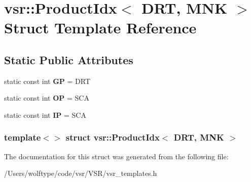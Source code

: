 \hypertarget{structvsr_1_1_product_idx_3_01_d_r_t_00_01_m_n_k_01_4}{\section{vsr\-:\-:Product\-Idx$<$ D\-R\-T, M\-N\-K $>$ Struct Template Reference}
\label{structvsr_1_1_product_idx_3_01_d_r_t_00_01_m_n_k_01_4}
}
\subsection*{Static Public Attributes}
\begin{DoxyCompactItemize}
\item 
\hypertarget{structvsr_1_1_product_idx_3_01_d_r_t_00_01_m_n_k_01_4_a48b327468261c88c5e99085841f7c0eb}{static const int {\bfseries G\-P} = D\-R\-T}\label{structvsr_1_1_product_idx_3_01_d_r_t_00_01_m_n_k_01_4_a48b327468261c88c5e99085841f7c0eb}

\item 
\hypertarget{structvsr_1_1_product_idx_3_01_d_r_t_00_01_m_n_k_01_4_ae5f3e129749d5ed65abc66baf1f56584}{static const int {\bfseries O\-P} = S\-C\-A}\label{structvsr_1_1_product_idx_3_01_d_r_t_00_01_m_n_k_01_4_ae5f3e129749d5ed65abc66baf1f56584}

\item 
\hypertarget{structvsr_1_1_product_idx_3_01_d_r_t_00_01_m_n_k_01_4_a71333cfc40283145ce865b04b2674345}{static const int {\bfseries I\-P} = S\-C\-A}\label{structvsr_1_1_product_idx_3_01_d_r_t_00_01_m_n_k_01_4_a71333cfc40283145ce865b04b2674345}

\end{DoxyCompactItemize}
\subsubsection*{template$<$$>$ struct vsr\-::\-Product\-Idx$<$ D\-R\-T, M\-N\-K $>$}



The documentation for this struct was generated from the following file\-:\begin{DoxyCompactItemize}
\item 
/\-Users/wolftype/code/vsr/\-V\-S\-R/vsr\-\_\-templates.\-h\end{DoxyCompactItemize}
